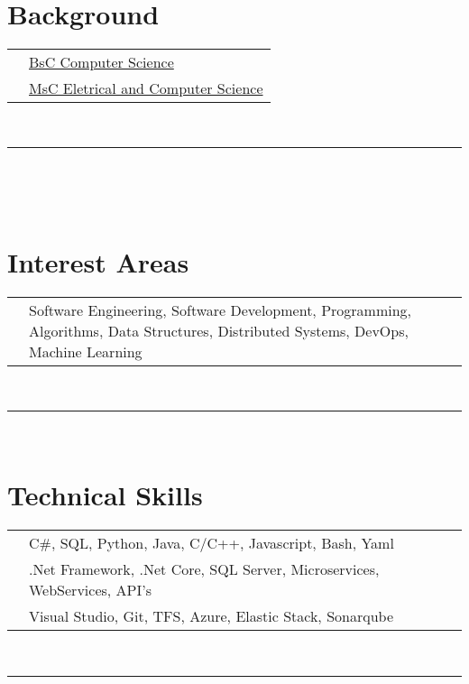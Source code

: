 \documentclass[oneside]{article}
\begin{document}
{\begin{minipage}[t][\textheight-2\fboxsep-2\fboxrule][t]{\dimexpr0.4\textwidth-2\fboxrule-2\fboxsep\relax}
        \vspace{0.3 cm} \\
        \section*{\normalsize Background}
        \begin{tabular}{cl}
            \faUniversity{} & \small \href{https://www.uevora.pt/}{BsC Computer Science} \\
            \faUniversity{} & \small \href{https://tecnico.ulisboa.pt/pt/}{MsC Eletrical and Computer Science}\\ 
        \end{tabular}
        \vspace{0.5cm} \\
        \rule{\linewidth}{0.4pt} \\

        \vspace{0.3 cm} \\
        \section*{\normalsize Interest Areas}
        \begin{tabularx}{\textwidth}{cY}
            \faInfo{} & \small Software Engineering, Software Development, Programming, Algorithms, Data Structures, Distributed Systems, DevOps, Machine Learning \\
        \end{tabularx}
        \vspace{0.5cm} \\
        \rule{\linewidth}{0.4pt}
        
        \vspace{0.3 cm} \\
        \section*{\normalsize Technical Skills}
        \begin{tabularx}{\textwidth}{cY}
            \faCode{} & \small C\#, SQL, Python, Java, C/C++, Javascript, Bash, Yaml \\
            \faLaptopCode{} & \small .Net Framework, .Net Core, SQL Server, Microservices, WebServices, API's \\
            \faToolbox{} & \small Visual Studio, Git, TFS, Azure, Elastic Stack, Sonarqube
        \end{tabularx}
        \vspace{0.5cm} \\
        \rule{\linewidth}{0.4pt}


\end{minipage}}
\end{document}

